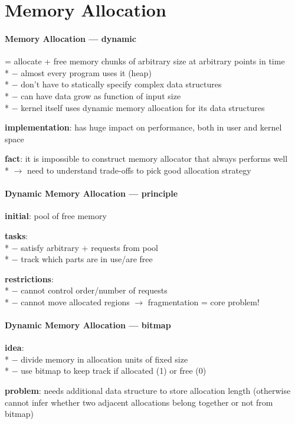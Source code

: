 \section{Memory Allocation}

\paragraph{Memory Allocation --- dynamic}
\begin{items}
  \item = allocate + free memory chunks of arbitrary size at arbitrary points in time \\*
    $ - $ almost every program uses it (heap) \\*
    $ - $ don't have to statically specify complex data structures \\*
    $ - $ can have data grow as function of input size \\*
    $ - $ kernel itself uses dynamic memory allocation for its data structures
  \item \textbf{implementation}: has huge impact on performance, both in user and kernel space
  \item \textbf{fact}: it is impossible to construct memory allocator that always performs well \\*
    $ \to $ need to understand trade-offs to pick good allocation strategy
\end{items}

\paragraph{Dynamic Memory Allocation --- principle}
\begin{items}
  \item \textbf{initial}: pool of free memory
  \item \textbf{tasks}: \\*
    $ - $ satisfy arbitrary  +  requests from pool \\*
    $ - $ track which parts are in use/are free
  \item \textbf{restrictions}: \\*
    $ - $ cannot control order/number of requests \\*
    $ - $ cannot move allocated regions $ \to $ fragmentation = core problem!
\end{items}

\paragraph{Dynamic Memory Allocation --- bitmap}
\begin{items}
  \item \textbf{idea}: \\*
    $ - $ divide memory in allocation units of fixed size \\*
    $ - $ use bitmap to keep track if allocated (1) or free (0)
  \item \textbf{problem}: needs additional data structure to store allocation length (otherwise cannot infer whether two adjacent allocations belong together or not from bitmap)
\end{items}

